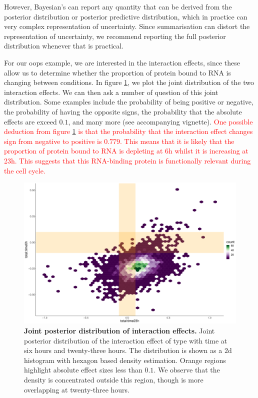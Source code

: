 \documentclass[12pt,english, journal=jpr, layout=twocolumn]{article}
\begin{document}
However, Bayesian's can report any quantity that can be derived from the posterior distribution or posterior predictive distribution, which in practice can very complex representation of uncertainty. Since summarisation can distort the representation of uncertainty, we recommend reporting the full posterior distribution whenever that is practical.

For our oops example, we are interested in the interaction effects, since these allow us to determine whether the proportion of protein bound to RNA is changing between conditions. In figure \ref{figure::figure4}, we plot the joint distribution of the two interaction effects. We can then ask a number of question of this joint distribution. Some examples include the probability of being positive or negative, the probability of having the opposite signs, the probability that the absolute effects are exceed $0.1$, and many more (see accompanying vignette). \textcolor{red}{One possible deduction from figure \ref{figure::figure4} is that the probability that the interaction effect changes sign from negative to positive is $0.779$. This means that it is likely that the proportion of protein bound to RNA is depleting at 6h whilst it is increasing at 23h. This suggests that this RNA-binding protein is functionally relevant during the cell cycle.}

\begin{figure}[h!]
	\centering
	\includegraphics[width =1\textwidth]{figure4.pdf}
	\caption{\textbf{Joint posterior distribution of interaction effects.} Joint posterior distribution of the interaction effect of type with time at six hours and twenty-three hours. The distribution is shown as a $2$d histogram with hexagon based density estimation. Orange regions highlight absolute effect sizes less than $0.1$. We observe that the density is concentrated outside this region, though is more overlapping at twenty-three hours.}
	\label{figure::figure4}
\end{figure}
\end{document}
